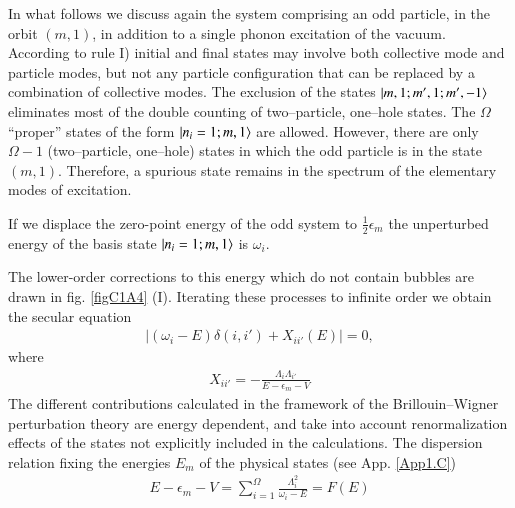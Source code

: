 In what follows we discuss again the system comprising an odd particle, in the orbit $(m, 1)$, in addition to a single phonon excitation of the vacuum. 
According to rule I) initial and final states may involve both collective mode and particle modes, but not any particle configuration that can be replaced by a combination of collective modes. The exclusion of the states $|{m,1; m',1;m',-1} \rangle$ eliminates most of the double counting of two--particle, one--hole states. The $\Omega$ ``proper'' states of the form $|{n_i=1;m,1} \rangle$ are allowed. However, 
there are only $\Omega-1$ (two--particle, one--hole) states in which the odd particle is in the state $(m, 1)$. Therefore, a spurious state remains in the spectrum of the elementary modes of excitation. 

If we displace the zero-point energy of the odd system to $\frac{1}{2}\epsilon_{m}$ the unperturbed energy of the basis state $|{n_i=1;m,1} \rangle$ is $\omega_i$. 



The lower-order corrections to this energy which do not contain bubbles 
are drawn in fig. \ref{figC1A4} (I). Iterating these processes to infinite order we obtain the secular equation 
  \begin{align}\label{eqC1A56} 
\left|(\omega_i-E)\delta(i,i')+X_{ii'}(E)\right|=0,
  \end{align} 
  where
    \begin{align}\label{eqC1A57} 
   X_{ii'}=-\frac{\Lambda_i\Lambda_{i'}}{E-\epsilon_m-V}
    \end{align} 
The different contributions calculated in the framework of the Brillouin--Wigner perturbation theory are energy dependent, and take into account renormalization effects of the states not explicitly included in the calculations. The dispersion relation fixing the energies $E_m$ of the physical states (see App. \ref{App1.C})
  \begin{align}\label{eqC1A60} 
 E-\epsilon_m-V=\sum_{i=1}^{\Omega}\frac{\Lambda_i^2}{\omega_i-E}=F(E)
  \end{align} 


